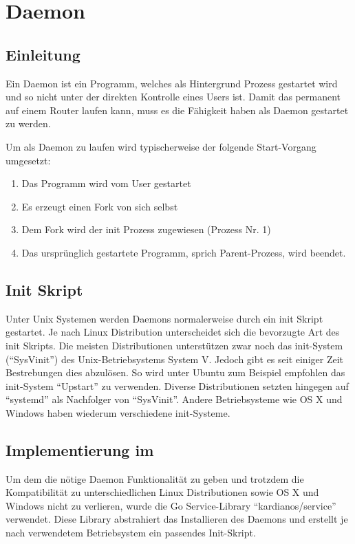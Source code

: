 \section{Daemon}
\label{sec:Daemon}

\subsection{Einleitung}
Ein Daemon ist ein Programm, welches als Hintergrund Prozess gestartet wird und so nicht unter der direkten Kontrolle eines Users ist. Damit das \tool{} permanent auf einem Router laufen kann, muss es die Fähigkeit haben als Daemon gestartet zu werden.

Um als Daemon zu laufen wird typischerweise der folgende Start-Vorgang umgesetzt:

\begin{enumerate}
  \item Das Programm wird vom User gestartet
  \item Es erzeugt einen Fork von sich selbst
  \item Dem Fork wird der init Prozess zugewiesen (Prozess Nr. 1)
  \item Das ursprünglich gestartete Programm, sprich Parent-Prozess, wird beendet.
\end{enumerate}

\subsection{Init Skript}
Unter Unix Systemen werden Daemons normalerweise durch ein init Skript gestartet. Je nach Linux Distribution unterscheidet sich die bevorzugte Art des init Skripts. Die meisten Distributionen unterstützen zwar noch das init-System (\enquote{SysVinit}) des Unix-Betriebsystems System V. Jedoch gibt es seit einiger Zeit Bestrebungen dies abzulösen. So wird unter Ubuntu zum Beispiel empfohlen das init-System \enquote{Upstart} zu verwenden. Diverse Distributionen setzten hingegen auf \enquote{systemd} als Nachfolger von \enquote{SysVinit}.
Andere Betriebsysteme wie OS X und Windows haben wiederum verschiedene init-Systeme.

\subsection{Implementierung im \tool{}}
Um dem \tool{} die nötige Daemon Funktionalität zu geben und trotzdem die Kompatibilität zu unterschiedlichen Linux Distributionen sowie OS X und Windows nicht zu verlieren, wurde die Go Service-Library \enquote{kardianos/service} verwendet. Diese Library abstrahiert das Installieren des Daemons und erstellt je nach verwendetem Betriebsystem ein passendes Init-Skript.

